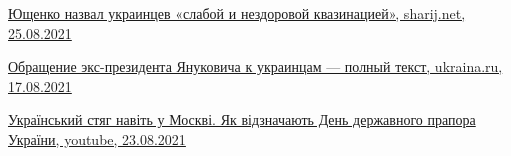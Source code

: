 

\href{https://sharij.net/yushhenko-nazval-ukrainczev-slaboj-i-nezdorovoj-kvazinacziej}{%
Ющенко назвал украинцев «слабой и нездоровой квазинацией», sharij.net, 25.08.2021%
}

\href{https://ukraina.ru/news/20210817/1032073904.html}{%
Обращение экс-президента Януковича к украинцам — полный текст, ukraina.ru, 17.08.2021%
}

\href{https://www.youtube.com/watch?v=T0qYB7jfPNM}{%
Український стяг навіть у Москві. Як відзначають День державного прапора України, youtube, 23.08.2021%
}
